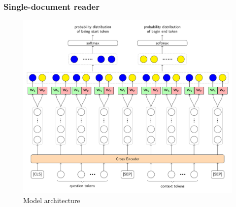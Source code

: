 \documentclass[11pt]{beamer}
\begin{document}
\begin{frame}
	\frametitle{Single-document reader}
	\vspace*{-10pt}
	\begin{figure}[h]
		\includegraphics[scale=.45]{images/PDF/singleDocReader/singleDocReader.pdf}
		\caption{Model architecture}
	\end{figure}
\end{frame}
\end{document}
